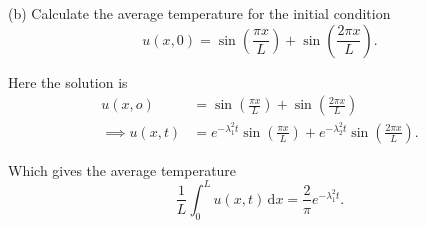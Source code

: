 (b) Calculate the average temperature for the initial condition
\[ 
u(x,0) = \sin \left( \frac{\pi x}{L} \right) + \sin \left( \frac{2 \pi x}{L} \right)
.\]

\hr

Here the solution is
\begin{align*}
  u(x,o) &= \sin \left( \frac{\pi x }{L} \right) + \sin \left( \frac{2 \pi x}{L} \right) \\
  \implies u(x,t) &= e^{-\lambda_1^2t} \sin \left( \frac{\pi x}{L} \right) + e^{-\lambda_2^2t} \sin \left( \frac{2 \pi x}{L} \right)
.\end{align*}

Which gives the average temperature
\[ 
\frac{1}{L} \int_{0}^{L} u(x,t) \, \mathrm{d}x = \frac{2}{\pi} e^{-\lambda_1^2t}
.\]

